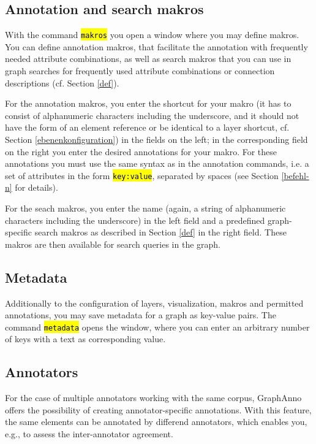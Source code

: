 \documentclass[12pt]{scrartcl}
\newcommand{\code}[1]{\hl{\texttt{#1}}}
\begin{document}
\subsection{Annotation and search makros}\label{annotationsmakros}

With the command \code{makros} you open a window where you may define makros.
You can define annotation makros, that facilitate the annotation with frequently needed attribute combinations, as well as search makros that you can use in graph searches for frequently used attribute combinations or connection descriptions (cf. Section \ref{def}).

For the annotation makros, you enter the shortcut for your makro (it has to consist of alphanumeric characters including the underscore, and it should not have the form of an element reference or be identical to a layer shortcut, cf. Section \ref{ebenenkonfiguration}) in the fields on the left; in the corresponding field on the right you enter the desired annotations for your makro.
For these annotations you must use the same syntax as in the annotation commands, i.e. a set of attributes in the form \code{key:value}, separated by spaces (see Section \ref{befehl-n} for details).

For the seach makros, you enter the name (again, a string of alphanumeric characters including the underscore) in the left field and a predefined graph-specific search makros as described in Section \ref{def} in the right field.
These makros are then available for search queries in the graph.


\subsection{Metadata}

Additionally to the configuration of layers, visualization, makros and permitted annotations, you may save metadata for a graph as key-value pairs.
The command \code{metadata} opens the window, where you can enter an arbitrary number of keys with a text as corresponding value.


\subsection{Annotators}\label{annotatoren}

For the case of multiple annotators working with the same corpus, GraphAnno offers the possibility of creating annotator-specific annotations.
With this feature, the same elements can be annotated by differend annotators, which enables you, e.g., to assess the inter-annotator agreement.
\end{document}
